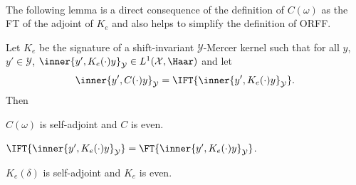 \paragraph{}
The following lemma is a direct consequence of the definition of $C(\omega)$ as
the \acl{FT} of the adjoint of $K_e$ and also helps to simplify the definition
of \acs{ORFF}.
\begin{lemma}
    \label{lm:C_characterization}
    Let $K_e$ be the signature of a shift-invariant $\mathcal{Y}$-Mercer kernel
    such that for all $y$, $y'\in\mathcal{Y}$, $\inner{y',
    K_e(\cdot)y}_{\mathcal{Y}}\in L^1(\mathcal{X},\Haar)$ and let
    \begin{dmath*}
        \inner{y', C(\cdot)y}_{\mathcal{Y}}=\IFT{\inner{y',
        K_e(\cdot)y}_{\mathcal{Y}}}.
    \end{dmath*}
    Then
    \begin{propenum}
        \item \label{lm:C_characterization_1} $C(\omega)$ is self-adjoint and
        $C$ is even.
        \item \label{lm:C_characterization_2} $\IFT{\inner{y',
        K_e(\cdot)y}_{\mathcal{Y}}} = \FT{\inner{y',
        K_e(\cdot)y}_{\mathcal{Y}}}$.
        \item \label{lm:C_characterization_3} $K_e(\delta)$ is self-adjoint and
        $K_e$ is even.
    \end{propenum}
\end{lemma}
